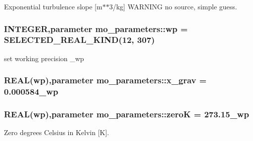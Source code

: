 Exponential turbulence slope \mbox{[}m$\ast$$\ast$3/kg\mbox{]} WARNING no source, simple guess. 

\hypertarget{namespacemo__parameters_a41be20bed1dcec244405328deaaffe30}{
\subsubsection[{wp}]{\setlength{\rightskip}{0pt plus 5cm}INTEGER,parameter {\bf mo\_\-parameters::wp} = SELECTED\_\-REAL\_\-KIND(12, 307)}}
\label{namespacemo__parameters_a41be20bed1dcec244405328deaaffe30}


set working precision \_\-wp 

\hypertarget{namespacemo__parameters_a8dd2eb8edab23a209cecbca50873fb83}{
\subsubsection[{x\_\-grav}]{\setlength{\rightskip}{0pt plus 5cm}REAL({\bf wp}),parameter {\bf mo\_\-parameters::x\_\-grav} = 0.000584\_\-wp}}
\label{namespacemo__parameters_a8dd2eb8edab23a209cecbca50873fb83}
\hypertarget{namespacemo__parameters_a4469df80801aa14e38268a452ce774a2}{
\subsubsection[{zeroK}]{\setlength{\rightskip}{0pt plus 5cm}REAL({\bf wp}),parameter {\bf mo\_\-parameters::zeroK} = 273.15\_\-wp}}
\label{namespacemo__parameters_a4469df80801aa14e38268a452ce774a2}


Zero degrees Celsius in Kelvin \mbox{[}K\mbox{]}. 

